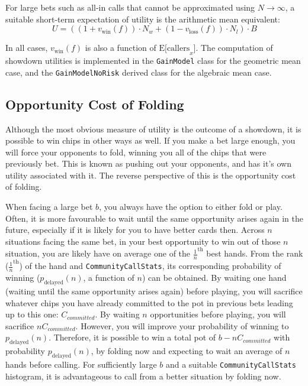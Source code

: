 For large bets such as all-in calls that cannot be approximated using $N \to \infty$, a suitable short-term expectation of utility is the arithmetic mean equivalent:
\[
U = \left( \left( 1 + v_{\mathrm{win}} \left( f \right) \right) \cdot N_w + \left( 1 - v_{\mathrm{loss}} \left( f \right) \right) \cdot N_l \right) \cdot B
\]

In all cases, $v_{\mathrm{win}} \left( f \right)$ is also a function of $\mathrm{E[callers}_x]$.
The computation of showdown utilities is implemented in the \texttt{GainModel} class for the geometric mean case, and the \texttt{GainModelNoRisk} derived class for the algebraic mean case.



\subsection{Opportunity Cost of Folding}
\label{sec:FoldEquity}
Although the most obvious measure of utility is the outcome of a showdown, it is possible to win chips in other ways as well.
If you make a bet large enough, you will force your opponents to fold, winning you all of the chips that were previously bet.
This is known as pushing out your opponents, and has it's own utility associated with it.
The reverse perspective of this is the opportunity cost of folding.

When facing a large bet $b$, you always have the option to either fold or play.
Often, it is more favourable to wait until the same opportunity arises again in the future, especially if it is likely for you to have better cards then.
Across $n$ situations facing the same bet, in your best opportunity to win out of those $n$ situation, you are likely have on average one of the $\frac{1}{n}^{\mathrm{th}}$ best hands.
From the rank ($\frac{1}{n}^{\mathrm{th}}$) of the hand and \texttt{CommunityCallStats}, its corresponding probability of winning ($p_{\mathrm{delayed}}(n)$, a function of $n$) can be obtained.
By waiting one hand (waiting until the same opportunity arises again) before playing, you will sacrifice whatever chips you have already committed to the pot in previous bets leading up to this one: $C_{committed}$.
By waiting $n$ opportunities before playing, you will sacrifice $n C_{committed}$.
However, you will improve your probability of winning to $p_{\mathrm{delayed}}(n)$.
Therefore, it is possible to win a total pot of $b-n C_{committed}$ with probability $p_{\mathrm{delayed}}(n)$, by folding now and expecting to wait an average of $n$ hands before calling.
For sufficiently large $b$ and a suitable \texttt{CommunityCallStats} histogram, it is advantageous to call from a better situation by folding now.

